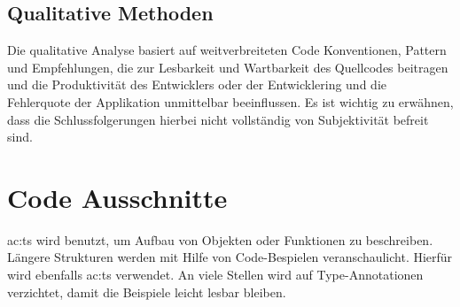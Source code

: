 \subsection {Qualitative Methoden}
Die qualitative Analyse basiert auf weitverbreiteten Code Konventionen, Pattern und Empfehlungen, die zur Lesbarkeit und Wartbarkeit des Quellcodes beitragen und die Produktivität des Entwicklers oder der Entwicklering und die Fehlerquote der Applikation unmittelbar beeinflussen. Es ist wichtig zu erwähnen, dass die Schlussfolgerungen hierbei nicht vollständig von Subjektivität befreit sind.

\section{Code Ausschnitte}

\acrlong{ac:ts} wird benutzt, um Aufbau von Objekten oder Funktionen zu beschreiben. Längere Strukturen werden mit Hilfe von Code-Bespielen veranschaulicht. Hierfür wird ebenfalls \acrlong{ac:ts} verwendet. An viele Stellen wird auf Type-Annotationen verzichtet, damit die Beispiele leicht lesbar bleiben.